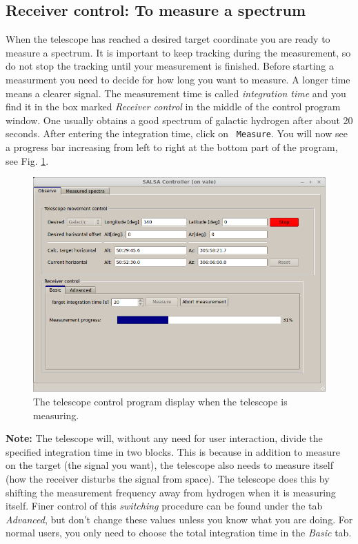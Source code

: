 \subsection{Receiver control: To measure a spectrum}
When the telescope has reached a desired target coordinate you are ready to
measure a spectrum. It is important to keep tracking during the measurement, so
do not stop the tracking until your measurement is finished.  Before starting a
measurment you need to decide for how long you want to measure. A longer time
means a clearer signal. The measurement time is called \emph{integration time}
and you find it in the box marked \emph{Receiver control} in the middle of the
control program window.  One usually obtains a good spectrum of galactic
hydrogen after about 20 seconds.  After entering the integration time, click on {\tt
Measure}. You will now see a progress bar increasing from left to right at
the bottom part of the program, see Fig.
\ref{fig:controlmeasure}.
\begin{figure}[ht]
\begin{center}
\includegraphics[width=\textwidth]{../figures/Controller_measure.png}
\end{center}
\caption{The telescope control program display when the telescope is measuring.}
\label{fig:controlmeasure}
\end{figure}

{\bf Note:} The telescope will, without any need for user interaction, divide
the specified integration time in two blocks. This is because in addition to
measure on the target (the signal you want), the telescope also needs to
measure itself (how the receiver disturbs the signal from space). The telescope
does this by shifting the measurement frequency away from hydrogen when it is measuring
itself. Finer control
of this \emph{switching} procedure can be found under the tab \emph{Advanced},
but don't change these values unless you know what you are doing. For normal users,
you only need to choose the total integration time in the \emph{Basic} tab.

